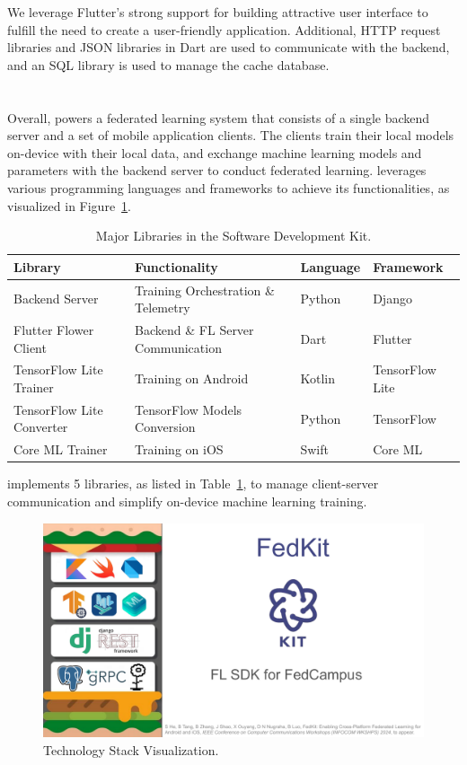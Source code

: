 We leverage Flutter's strong support for
building attractive user interface to fulfill the need to
create a user-friendly application.
Additional, HTTP request libraries and JSON libraries in Dart are used to
communicate with the backend,
and an SQL library is used to manage the cache database.

\section{\fedkit}

Overall, \fedkit powers a federated learning system that
consists of a single backend server and a set of mobile application clients.
The clients train their local models on-device with their local data,
and exchange machine learning models and parameters with the backend server to
conduct federated learning.
\fedkit leverages various programming languages and frameworks to achieve its
functionalities, as visualized in Figure~\ref{fig:stack-viz}.

\begin{table}\begin{center}
    \begin{tabular}{llll}
Library&Functionality&Language&Framework\\\hline
Backend Server&Training Orchestration \& Telemetry&Python&Django\\
Flutter Flower Client&Backend \& FL Server Communication&Dart&Flutter\\
TensorFlow Lite Trainer&Training on Android&Kotlin&TensorFlow Lite\\
TensorFlow Lite Converter&TensorFlow Models Conversion&Python&TensorFlow\\
Core ML Trainer&Training on iOS&Swift&Core ML
    \end{tabular}
    \caption{Major Libraries in the \fedkit Software Development Kit.}
\label{table:libs}
\end{center}\end{table}

\fedkit implements 5 libraries, as listed in Table~\ref{table:libs},
to manage client-server communication and simplify on-device machine learning
training.

\begin{figure}\begin{center}
    \includegraphics[width=0.4\linewidth]{stack_visualization.pdf}
    \caption{\fedkit Technology Stack Visualization.}
    \label{fig:stack-viz}
\end{center}\end{figure}

